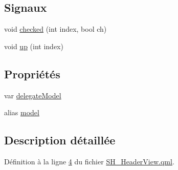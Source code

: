 \subsection*{Signaux}
\begin{DoxyCompactItemize}
\item 
void \hyperlink{classSH__HeaderView_a2611d41d3701c88a2d54d651a7df96e8}{checked} (int index, bool ch)
\item 
void \hyperlink{classSH__HeaderView_a6f5afde99467a14e7ed30b3c9d4f3f81}{up} (int index)
\end{DoxyCompactItemize}
\subsection*{Propriétés}
\begin{DoxyCompactItemize}
\item 
var \hyperlink{classSH__HeaderView_a95ec60701e7213acbe17fdc477feb83c}{delegate\-Model}
\item 
alias \hyperlink{classSH__HeaderView_abf76f87214384e86fb9413047287161d}{model}
\end{DoxyCompactItemize}


\subsection{Description détaillée}


Définition à la ligne \hyperlink{SH__HeaderView_8qml_source_l00004}{4} du fichier \hyperlink{SH__HeaderView_8qml_source}{S\-H\-\_\-\-Header\-View.\-qml}.



